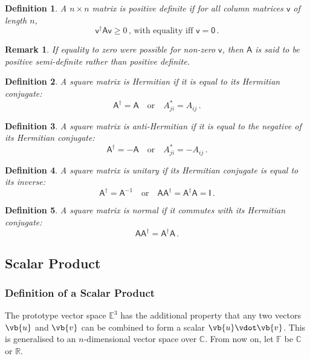 \documentclass{article}
\theoremstyle{plain}\theoremheaderfont{\normalfont\itshape}\theorembodyfont{\rmfamily}\theoremseparator{.}\newtheorem*{rem}{Remark}\newtheorem*{ex}{Example}\newtheorem*{proof}{Proof}\newtheorem*{altp}{Alternative proof}
\theoremstyle{plain}\theoremheaderfont{\normalfont\bfseries}\theorembodyfont{\rmfamily}\theoremseparator{.}\newtheorem{thm}{Theorem}[section]\newtheorem{lem}[thm]{Lemma}\newtheorem{prop}[thm]{Proposition}\newtheorem*{cor}{Corollary}\newtheorem{defn}[thm]{Definition}\newtheorem{clm}[thm]{Claim}\newtheorem{clminproof}{Claim}
\theoremstyle{break}\theoremheaderfont{\normalfont\itshape}\theorembodyfont{\rmfamily}\theoremseparator{.\medskip}\newtheorem*{proofskip}{Proof}\newtheorem*{exs}{Examples}\newtheorem*{rems}{Remarks}
\theoremstyle{break}\theoremheaderfont{\normalfont\bfseries}\theorembodyfont{\rmfamily}\theoremseparator{.\medskip}\newtheorem{lemskip}[thm]{Lemma}\newtheorem{defnskip}[thm]{Definition}\newtheorem{propskip}[thm]{Proposition}\newtheorem{thmskip}[thm]{Theorem}
\numberwithin{equation}{section}
\begin{document}
	\begin{defn}
		A \(n\times n\) matrix is \textit{positive definite} if for all column matrices \(\mathsf{v}\) of length \(n\),
		\[\mathsf{v^\dagger Av}\ge 0\,\text{, with equality iff }\mathsf{v}=\mathsf{0}\,.\]
	\end{defn}
	\begin{rem}
		If equality to zero were possible for non-zero \(\mathsf{v}\), then \(\mathsf{A}\) is said to be \textit{positive semi-definite} rather than positive definite.
	\end{rem}
	\begin{defn}
		A square matrix is \textit{Hermitian} if it is equal to its Hermitian conjugate:
		\[\mathsf{A}^\dagger=\mathsf{A}\quad\text{or}\quad A_{ji}^*=A_{ij}\,.\]
	\end{defn}
	\begin{defn}
		A square matrix is \textit{anti-Hermitian} if it is equal to the negative of its Hermitian conjugate:
		\[\mathsf{A}^\dagger=-\mathsf{A}\quad\text{or}\quad A_{ji}^*=-A_{ij}\,.\]
	\end{defn}
	\begin{defn}
		A square matrix is \textit{unitary} if its Hermitian conjugate is equal to its inverse:
		\[\mathsf{A}^\dagger=\mathsf{A}^{-1}\quad\text{or}\quad \mathsf{AA}^\dagger=\mathsf{A}^\dagger\mathsf{A}=\mathsf{I}\,.\]
	\end{defn}
	\begin{defn}
		A square matrix is \textit{normal} if it commutes with its Hermitian conjugate:
		\[\mathsf{AA}^\dagger=\mathsf{A}^\dagger\mathsf{A}\,.\]
	\end{defn}
	
	\subsection{Scalar Product}
	\subsubsection{Definition of a Scalar Product}
	The prototype vector space \(\mathbb{E}^3\) has the additional property that any two vectors \(\vb{u}\) and \(\vb{v}\) can be combined to form a scalar \(\vb{u}\vdot\vb{v}\). This is generalised to an \(n\)-dimensional vector space over \(\mathbb{C}\). From now on, let \(\mathbb{F}\) be \(\mathbb{C}\) or \(\mathbb{R}\).
\end{document}
